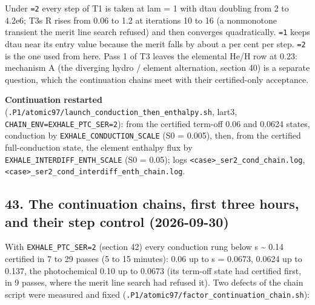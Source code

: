 \documentclass[english,a4paper]{my_memo}
\begin{document}
Under \texttt{=2} every step of T1 is taken at lam = 1 with dtau doubling from 2 to
4.2e6; T3\textquotesingle s \textbar\textbar R\textbar\textbar{} rises from 0.06 to 1.2 at iterations 10 to 16 (a
nonmonotone transient the merit line search refused) and then converges
quadratically. \texttt{=1} keeps dtau near its entry value because the merit falls
by about a per cent per step. \texttt{=2} is the one used from here. Pass 1 of T3
leaves the elemental He/H row at 0.23: mechanism A (the diverging hydro /
element alternation, section 40) is a separate question, which the
continuation chains meet with their certified-only acceptance.

\textbf{Continuation restarted} (\texttt{.P1/atomic97/launch\_conduction\_then\_enthalpy.sh},
lart3, \texttt{CHAIN\_ENV=EXHALE\_PTC\_SER=2}): from the certified term-off 0.06 and
0.0624 states, conduction by \texttt{EXHALE\_CONDUCTION\_SCALE} (S0 = 0.005), then,
from the certified full-conduction state, the element enthalpy flux by
\texttt{EXHALE\_INTERDIFF\_ENTH\_SCALE} (S0 = 0.05); logs
\texttt{\textless{}case\textgreater{}\_ser2\_cond\_chain.log}, \texttt{\textless{}case\textgreater{}\_ser2\_cond\_interdiff\_enth\_chain.log}.

\subsection{43. The continuation chains, first three hours, and their step control (2026-09-30)}\label{43-the-continuation-chains-first-three-hours-and-their-step-control-2026-09-30}

With \texttt{EXHALE\_PTC\_SER=2} (section 42) every conduction rung below s \textasciitilde{} 0.14
certified in 7 to 29 passes (5 to 15 minutes): 0.06 up to s = 0.0673,
0.0624 up to 0.137, the photochemical 0.10 up to 0.0673 (its term-off
state had certified first, in 9 passes, where the merit line search had
refused it). Two defects of the chain script were measured and fixed
(\texttt{.P1/atomic97/factor\_continuation\_chain.sh}):
\end{document}
